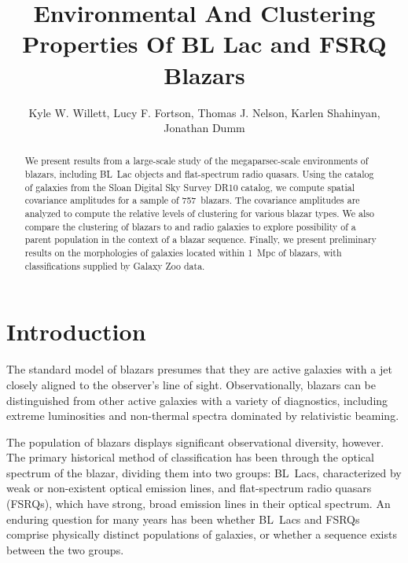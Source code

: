 \documentclass{emulateapj}
\begin{document}
\title{Environmental And Clustering Properties Of BL Lac and FSRQ Blazars}

\author{Kyle W. Willett, Lucy F. Fortson, Thomas J. Nelson, Karlen Shahinyan, Jonathan Dumm}


\begin{abstract}
We present results from a large-scale study of the megaparsec-scale environments of blazars, including BL~Lac objects and flat-spectrum radio quasars. Using the catalog of galaxies from the Sloan Digital Sky Survey DR10 catalog, we compute spatial covariance amplitudes for a sample of 757~blazars. The covariance amplitudes are analyzed to compute the relative levels of clustering for various blazar types. We also compare the clustering of blazars to \FRI{} and \FRII{} radio galaxies to explore possibility of a parent population in the context of a blazar sequence. Finally, we present preliminary results on the morphologies of galaxies located within 1~Mpc of blazars, with classifications supplied by Galaxy Zoo data.
\end{abstract}


\section{Introduction} \label{sec:intro}


The standard model of blazars presumes that they are active galaxies with a jet closely aligned to the observer's line of sight. Observationally, blazars can be distinguished from other active galaxies with a variety of diagnostics, including extreme luminosities and non-thermal spectra dominated by relativistic beaming. 

The population of blazars displays significant observational diversity, however. The primary historical method of classification has been through the optical spectrum of the blazar, dividing them into two groups: BL~Lacs, characterized by weak or non-existent optical emission lines, and flat-spectrum radio quasars (FSRQs), which have strong, broad emission lines in their optical spectrum. An enduring question for many years has been whether BL~Lacs and FSRQs comprise physically distinct populations of galaxies, or whether a sequence exists between the two groups. 
\end{document}
